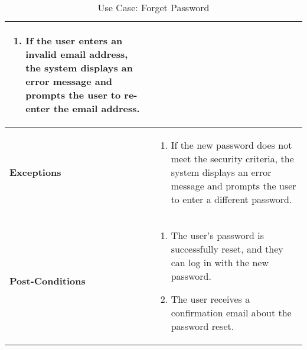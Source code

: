 \begin{table}[!ht]
\begin{tabularx}{\textwidth}{|l|X|}
\begin{enumerate}[label=--,itemsep=0pt]
            \item If the user enters an invalid email address, the system displays an error message and prompts the user to re-enter the email address.
        \end{enumerate} \\
        \hline
        \textbf{Exceptions} & 
        \begin{enumerate}[label=--,itemsep=0pt]
            \item If the new password does not meet the security criteria, the system displays an error message and prompts the user to enter a different password.
        \end{enumerate} \\
        \hline
        \textbf{Post-Conditions} & 
        \begin{enumerate}[label=--,itemsep=0pt]
            \item The user's password is successfully reset, and they can log in with the new password.
            \item The user receives a confirmation email about the password reset.
        \end{enumerate} \\
        \hline
    \end{tabularx}
    \caption{Use Case: Forget Password}
    \label{tab:use-case-forget-password}
\end{table}


